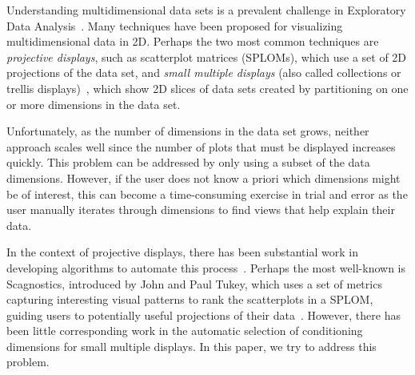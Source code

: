 

Understanding multidimensional data sets is a prevalent challenge in Exploratory Data Analysis~\cite{Tukey1977}. Many techniques have been proposed for visualizing multidimensional data in 2D. Perhaps the two most common techniques are
\emph{projective displays}, such as scatterplot matrices (SPLOMs), which use a set of 2D projections of the data set,
and \emph{small multiple displays} (also called collections or trellis displays)~\cite{Bertin1983, tufte1986, Becker1996}, which show 2D slices of data sets created by partitioning on one or more dimensions in the data set.

Unfortunately, as the number of dimensions in the data set grows, neither approach scales well since the number of plots that must be displayed increases quickly. This problem can be addressed by only using a subset of the data dimensions. However, if the user does not know a priori which dimensions might be of interest, this can become a time-consuming exercise in trial and error as the user manually iterates through dimensions to find views that help explain their data. 

In the context of projective displays, there has been substantial work in developing algorithms to automate this process~\cite{Seo2005,Wilkinson2005,Sips2009}.
Perhaps the most well-known is Scagnostics, introduced by John and Paul Tukey, which uses a set of metrics capturing interesting visual patterns to rank the scatterplots in a SPLOM, guiding users to potentially useful projections of their data~\cite{}.
However, there has been little corresponding work in the automatic selection of conditioning dimensions for small multiple displays. In this paper, we try to address this problem.

